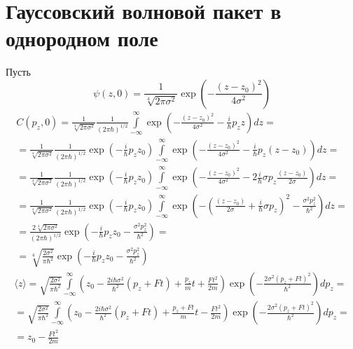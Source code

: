 \section{Гауссовский волновой пакет в однородном поле}

Пусть
\[
	\psi(z, 0) = \frac{1}{\sqrt[4]{2\pi \sigma^2}} \exp \left( -\frac{(z - z_0)^2}{4\sigma^2}\right)
\]
\[
	\begin{gathered}
		C(p_z, 0) = \frac{1}{\sqrt[4]{2\pi \sigma^2}}\frac{1}{(2\pi\hbar)^{1/2}} \int\limits_{-\infty}^{\infty} \exp \left(-\frac{(z - z_0)^2}{4\sigma^2} - \frac{i}{\hbar} p_z z  \right) dz = \\
		=
		\frac{1}{\sqrt[4]{2\pi \sigma^2}}\frac{1}{(2\pi\hbar)^{1/2}} \exp\left(-\frac{i}{\hbar}p_z z_0\right)\int\limits_{-\infty}^{\infty} \exp \left(-\frac{(z - z_0)^2}{4\sigma^2} - \frac{i}{\hbar} p_z (z - z_0)  \right) dz = \\
		=
		\frac{1}{\sqrt[4]{2\pi \sigma^2}}\frac{1}{(2\pi\hbar)^{1/2}} \exp\left(-\frac{i}{\hbar}p_z z_0\right)
		\int\limits_{-\infty}^{\infty} \exp \left(-\frac{(z - z_0)^2}{4\sigma^2} - 2 \frac{i}{\hbar} \sigma p_z \frac{(z - z_0)}{2 \sigma}  \right) dz = \\
		=
		\frac{1}{\sqrt[4]{2\pi \sigma^2}}\frac{1}{(2\pi\hbar)^{1/2}} \exp\left(-\frac{i}{\hbar}p_z z_0\right)
		\int\limits_{-\infty}^{\infty} \exp \left(-\left(\frac{(z - z_0)}{2 \sigma} + \frac{i}{\hbar} \sigma p_z \right)^2 - \frac{\sigma^2 p_z^2}{\hbar^2}  \right) dz = \\
		=
		\frac{2\sqrt[4]{2\pi \sigma^2}}{(2\pi\hbar)^{1/2}} \exp\left(-\frac{i}{\hbar}p_z z_0 - \frac{\sigma^2 p_z^2}{\hbar^2} \right) = \\
		=
		\sqrt[4]{\frac{2\sigma^2}{\pi \hbar^2}} \exp\left(-\frac{i}{\hbar}p_z z_0 - \frac{\sigma^2 p_z^2}{\hbar^2} \right)
	\end{gathered}
\]
\[
	\begin{gathered}
		\langle z \rangle =
		\sqrt{\frac{2\sigma^2}{\pi \hbar^2}} 
		\int\limits_{-\infty}^{\infty} \left(z_0 - \frac{2i\hbar \sigma^2}{\hbar^2} (p_z + Ft) + \frac{p_z}{m} t +  \frac{F t^2}{2m}\right) 
		\exp\left( - \frac{2\sigma^2 (p_z + Ft)^2}{\hbar^2} \right) dp_z = \\
		=
		\sqrt{\frac{2\sigma^2}{\pi \hbar^2}} 
		\int\limits_{-\infty}^{\infty} \left(z_0 - \frac{2i\hbar \sigma^2}{\hbar^2} (p_z + Ft) + \frac{p_z + F t}{m} t -  \frac{F t^2}{2m}\right) 
		\exp\left( - \frac{2\sigma^2 (p_z + Ft)^2}{\hbar^2} \right) dp_z = \\
		=
		z_0 - \frac{F t^2}{2m}	
	\end{gathered}
\]
